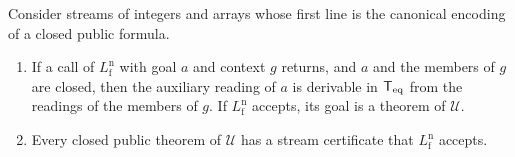 \begin{proposition}\label{cert:prop:printed}
Consider streams of integers and arrays whose first line is the canonical encoding of a closed
public formula.
\begin{enumerate}[label=(\alph*)]
\item If a call of $L^{\mathrm n}_{\mathrm f}$ with goal $a$ and context $g$ returns, and $a$ and the
members of $g$ are closed, then the auxiliary reading of $a$ is derivable in $\mathsf{T}_{\mathrm{eq}}$ from the readings
of the members of $g$. If $L^{\mathrm n}_{\mathrm f}$ accepts, its goal is a theorem of $\mathcal U$.
\item Every closed public theorem of $\mathcal U$ has a stream certificate that
$L^{\mathrm n}_{\mathrm f}$ accepts.
\end{enumerate}
\end{proposition}
